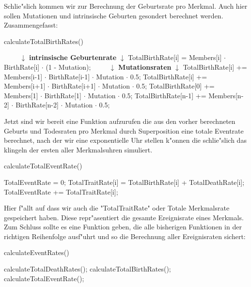 \documentclass[11pt, a4paper, german]{article}
\begin{document}
	Schlie"slich kommen wir zur Berechnung der Geburtsrate pro Merkmal. Auch hier sollen Mutationen und intrinsische Geburten gesondert berechnet werden. Zusammengefasst:
	\begin{algorithm}[H]
		\caption{calculateTotalBirthRates()}
		\begin{algorithmic}[1]
			\STATE $ \qquad $ $ \downarrow $ \textbf{intrinsische Geburtenrate} $ \downarrow $
				\STATE TotalBirthRate[i] = Members[i] $ \cdot $ BirthRate[i] $ \cdot $ (1 - Mutation);
			\ENDFOR
			\STATE $ \qquad $ $ \downarrow $ \textbf{Mutationsraten} $ \downarrow $
				\STATE TotalBirthRate[i] += Members[i-1] $ \cdot $ BirthRate[i-1] $ \cdot $ Mutation $ \cdot $ 0.5;
				\STATE TotalBirthRate[i] += Members[i+1] $ \cdot $ BirthRate[i+1] $ \cdot $ Mutation $ \cdot $ 0.5;
			\ENDFOR
			\STATE TotalBirthRate[0] += Members[1] $ \cdot $ BirthRate[1] $ \cdot $ Mutation $ \cdot $ 0.5;
			\STATE TotalBirthRate[n-1] += Members[n-2] $ \cdot $ BirthRate[n-2] $ \cdot $ Mutation $ \cdot $ 0.5;
		\end{algorithmic}
	\end{algorithm}
	 Jetzt sind wir bereit eine Funktion aufzurufen die aus den vorher berechneten Geburts und Todesraten pro Merkmal durch Superposition eine totale Eventrate berechnet, nach der wir eine exponentielle Uhr stellen k"onnen die schlie"slich das klingeln der ersten aller Merkmalsuhren simuliert.
	 \begin{algorithm}[H]
 		\caption{calculateTotalEventRate()}
 		\begin{algorithmic}[1]
 			\STATE TotalEventRate = 0;
 				\STATE TotalTraitRate[i] = TotalBirthRate[i] + TotalDeathRate[i];
 				\STATE TotalEventRate += TotalTraitRate[i];
 			\ENDFOR
 		\end{algorithmic}
 	\end{algorithm}
 	Hier f"allt auf dass wir auch die "{}TotalTraitRate"{} oder Totale Merkmalsrate gespeichert haben. Diese repr"asentiert die gesamte Ereignisrate eines Merkmals.\\
 	Zum Schluss sollte es eine Funktion geben, die alle bisherigen Funktionen in der richtigen Reihenfolge ausf"uhrt und so die Berechnung aller Ereignisraten sichert:
 	\begin{algorithm}[H]
 		\caption{calculateEventRates()}
 		\begin{algorithmic}[1]
 			\STATE calculateTotalDeathRates();
 			\STATE calculateTotalBirthRates();
 			\STATE calculateTotalEventRate();
 		\end{algorithmic}
 	\end{algorithm}
	
\end{document}

